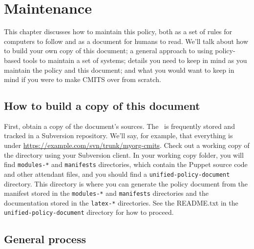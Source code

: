 \chapter{Maintenance}
\label{Maintenance}

This chapter discusses how to maintain this policy, both as a set of
rules for computers to follow and as a document for humans to
read. We'll talk about how to build your own copy of this document; a
general approach to using policy-based tools to maintain a set of
systems; details you need to keep in mind as you maintain the policy
and this document; and what you would want to keep in mind if you were
to make CMITS over from scratch.



\section{How to build a copy of this document}
\label{generating}

First, obtain a copy of the document's sources. The \CMITSPolicy\ is
frequently stored and tracked in a Subversion repository. We'll say, for
example, that everything is under
\url{https://example.com/svn/trunk/myorg-cmits}. Check out a working copy
of the directory using your Subversion client. In your working copy
folder, you will find {\tt modules-*} and {\tt manifests} directories,
which contain the Puppet source code and other attendant files, and you
should find a {\tt unified-policy-document} directory. This directory
is where you can generate the policy document from the manifest stored in
the {\tt modules-*} and {\tt manifests} directories and the documentation
stored in the {\tt latex-*} directories. See the README.txt in the {\tt
unified-policy-document} directory for how to proceed.




\section{General process}

